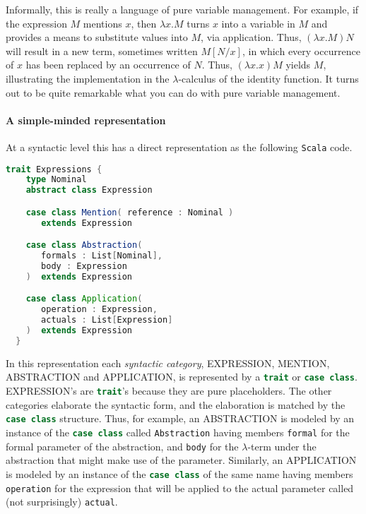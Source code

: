 
Informally, this is really a language of pure variable management. For
example, if the expression $M$ mentions $x$, then $\lambda x. M$ turns
$x$ into a variable in $M$ and provides a means to substitute values
into $M$, via application. Thus, $(\lambda x.M)N$ will result in a new
term, sometimes written $M[N/x]$, in which every occurrence of $x$ has
been replaced by an occurrence of $N$. Thus, $(\lambda x.x)M$ yields
$M$, illustrating the implementation in the $\lambda$-calculus of the
identity function. It turns out to be quite remarkable what you can do
with pure variable management.

\paragraph{A simple-minded representation}
At a syntactic level this has a direct representation as the following
\texttt{Scala} code.

\break
\begin{lstlisting}[language=Scala]
  trait Expressions {
    type Nominal    
    abstract class Expression

    case class Mention( reference : Nominal )
       extends Expression

    case class Abstraction(
       formals : List[Nominal],
       body : Expression
    )  extends Expression

    case class Application(
       operation : Expression,
       actuals : List[Expression]
    )  extends Expression        
  }
\end{lstlisting}

In this representation each \emph{syntactic category}, EXPRESSION, MENTION,
ABSTRACTION and APPLICATION, is represented by a
\lstinline[language=Scala]!trait! or \lstinline[language=Scala]!case class!.
EXPRESSION's are \lstinline[language=Scala]!trait!'s because they
are pure placeholders. The other categories elaborate the syntactic
form, and the elaboration is matched by the
\lstinline[language=Scala]!case class!  structure. Thus, for example,
an ABSTRACTION is modeled by an instance of the
\lstinline[language=Scala]!case class! called
\lstinline[language=Scala]!Abstraction! having members
\lstinline[language=Scala]!formal! for the formal parameter of the
abstraction, and \lstinline[language=Scala]!body! for the
$\lambda$-term under the abstraction that might make use of the
parameter. Similarly, an APPLICATION is modeled by an instance of the
\lstinline[language=Scala]!case class! of the same name having members
\lstinline[language=Scala]!operation! for the expression that will be applied
to the actual parameter called (not surprisingly)
\lstinline[language=Scala]!actual!.

